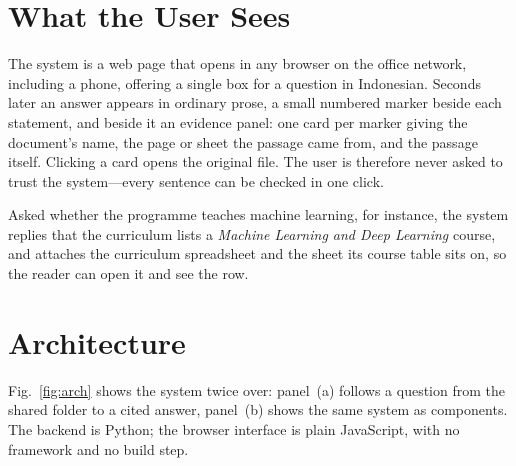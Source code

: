 \documentclass[conference]{IEEEtran}
\begin{document}
\section{What the User Sees}

The system is a web page that opens in any browser on the office network,
including a phone, offering a single box for a question in Indonesian. Seconds
later an answer appears in ordinary prose, a small numbered marker beside each
statement, and beside it an evidence panel: one card per marker giving the
document's name, the page or sheet the passage came from, and the passage
itself. Clicking a card opens the original file. The user is therefore never
asked to trust the system---every sentence can be checked in one click.

Asked whether the programme teaches machine learning, for instance, the system
replies that the curriculum lists a \emph{Machine Learning and Deep Learning}
course, and attaches the curriculum spreadsheet and the sheet its course table
sits on, so the reader can open it and see the row.

\section{Architecture}

Fig.~\ref{fig:arch} shows the system twice over: panel~(a) follows a question
from the shared folder to a cited answer, panel~(b) shows the same system as
components. The backend is Python; the browser interface is plain JavaScript,
with no framework and no build step.
\end{document}
